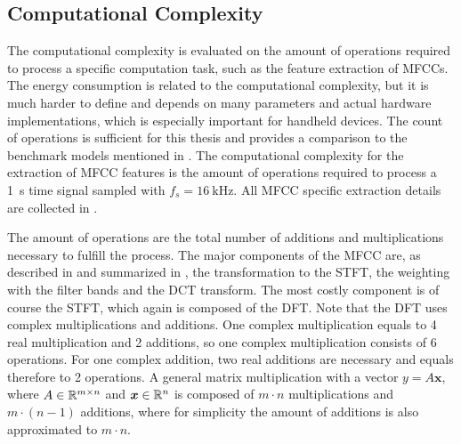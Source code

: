 
\subsection{Computational Complexity}\label{sec:signal_mfcc_complexity}
The computational complexity is evaluated on the amount of operations required to process a specific computation task, such as the feature extraction of MFCCs.
The energy consumption is related to the computational complexity, but it is much harder to define and depends on many parameters and actual hardware implementations, which is especially important for handheld devices.
The count of operations is sufficient for this thesis and provides a comparison to the benchmark models mentioned in .
The computational complexity for the extraction of MFCC features is the amount of operations required to process a \SI{1}{\second} time signal sampled with $f_s = \SI{16}{\kilo\hertz}$.
All MFCC specific extraction details are collected in .

The amount of operations are the total number of additions and multiplications necessary to fulfill the process.
The major components of the MFCC are, as described in  and summarized in , the transformation to the STFT, the weighting with the filter bands and the DCT transform.
The most costly component is of course the STFT, which again is composed of the DFT.
Note that the DFT uses complex multiplications and additions.
One complex multiplication equals to 4 real multiplication and 2 additions, so one complex multiplication consists of 6 operations.
For one complex addition, two real additions are necessary and equals therefore to 2 operations.
A general matrix multiplication with a vector $y = A \bm{x}$, where $A \in \mathbb{R}^{m \times n}$ and $\bm{x} \in \mathbb{R}^n$ is composed of $m \cdot n$ multiplications and $m \cdot (n - 1)$ additions, where for simplicity the amount of additions is also approximated to $m \cdot n$.

